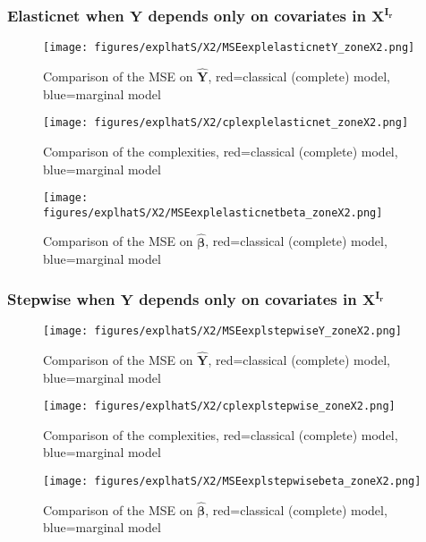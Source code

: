 \documentclass[12pt,a4paper]{report}
\begin{document}
\subsubsection{Elasticnet when $\boldsymbol{Y}$ depends only on covariates in $\boldsymbol{X^{I_r}}$}

	\begin{figure}[h!]
	\centering
		  \texttt{[image: figures/explhatS/X2/MSEexplelasticnetY\_zoneX2.png]}
		\caption{Comparison of the MSE on $\hat{\boldsymbol{Y}}$, red=classical (complete) model, blue=marginal model}\label{MSEexplelasticnetY_zoneX2}
	\end{figure}
	\begin{figure}[h!]
	\centering
		  \texttt{[image: figures/explhatS/X2/cplexplelasticnet\_zoneX2.png]}
		\caption{Comparison of the complexities, red=classical (complete) model, blue=marginal model}\label{cplexplelasticnet_zoneX2}
	\end{figure}
	\begin{figure}[h!]
	\centering
		  \texttt{[image: figures/explhatS/X2/MSEexplelasticnetbeta\_zoneX2.png]}
		\caption{Comparison of the MSE on $\hat{\boldsymbol{\beta}}$, red=classical (complete) model, blue=marginal model}\label{MSEexplelasticnetbeta_zoneX2}
	\end{figure}
	\FloatBarrier
\newpage
\subsubsection{Stepwise when $\boldsymbol{Y}$ depends only on covariates in $\boldsymbol{X^{I_r}}$}

	\begin{figure}[h!]
	\centering
		  \texttt{[image: figures/explhatS/X2/MSEexplstepwiseY\_zoneX2.png]}
		\caption{Comparison of the MSE on $\hat{\boldsymbol{Y}}$, red=classical (complete) model, blue=marginal model}\label{MSEexplstepwiseY_zoneX2}
	\end{figure}
	\begin{figure}[h!]
	\centering
		  \texttt{[image: figures/explhatS/X2/cplexplstepwise\_zoneX2.png]}
		\caption{Comparison of the complexities, red=classical (complete) model, blue=marginal model}\label{cplexplstepwise_zoneX2}
	\end{figure}
	\begin{figure}[h!]
	\centering
		  \texttt{[image: figures/explhatS/X2/MSEexplstepwisebeta\_zoneX2.png]}
		\caption{Comparison of the MSE on $\hat{\boldsymbol{\beta}}$, red=classical (complete) model, blue=marginal model}\label{MSEexplstepwisebeta_zoneX2}
	\end{figure}
	\FloatBarrier
\newpage
\end{document}
